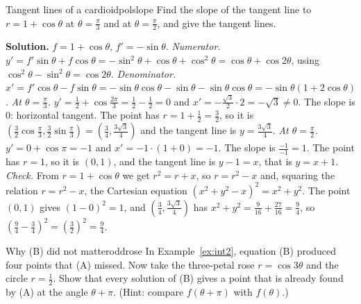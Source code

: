 \documentclass[11pt]{article}
\begin{document}
\begin{exmp}{Tangent lines of a cardioid}{polslope}
Find the slope of the tangent line to $r=1+\cos\theta$ at $\theta=\frac\pi3$ and at $\theta=\frac\pi2$, and give the tangent lines.

\textbf{Solution.} $f=1+\cos\theta$, $f'=-\sin\theta$. \emph{Numerator.} $y'=f'\sin\theta+f\cos\theta=-\sin^2\theta+\cos\theta+\cos^2\theta=\cos\theta+\cos2\theta$, using $\cos^2\theta-\sin^2\theta=\cos2\theta$. \emph{Denominator.} $x'=f'\cos\theta-f\sin\theta=-\sin\theta\cos\theta-\sin\theta-\sin\theta\cos\theta=-\sin\theta(1+2\cos\theta)$.
\emph{At $\theta=\frac\pi3$.} $y'=\frac12+\cos\frac{2\pi}3=\frac12-\frac12=0$ and $x'=-\frac{\sqrt3}2\cdot2=-\sqrt3\ne0$. The slope is $0$: horizontal tangent. The point has $r=1+\frac12=\frac32$, so it is $\left(\frac32\cos\frac\pi3,\frac32\sin\frac\pi3\right)=\left(\frac34,\frac{3\sqrt3}4\right)$ and the tangent line is $y=\frac{3\sqrt3}4$.
\emph{At $\theta=\frac\pi2$.} $y'=0+\cos\pi=-1$ and $x'=-1\cdot(1+0)=-1$. The slope is $\frac{-1}{-1}=1$. The point has $r=1$, so it is $(0,1)$, and the tangent line is $y-1=x$, that is $y=x+1$.
\emph{Check.} From $r=1+\cos\theta$ we get $r^2=r+x$, so $r=r^2-x$ and, squaring the relation $r=r^2-x$, the Cartesian equation $(x^2+y^2-x)^2=x^2+y^2$. The point $(0,1)$ gives $(1-0)^2=1$, and $\left(\frac34,\frac{3\sqrt3}4\right)$ has $x^2+y^2=\frac9{16}+\frac{27}{16}=\frac94$, so $\left(\frac94-\frac34\right)^2=\left(\frac32\right)^2=\frac94$.
\end{exmp}

\begin{think}{Why (B) did not matter}{oddrose}
In Example~\ref{ex:int2}, equation (B) produced four points that (A) missed. Now take the three-petal rose $r=\cos3\theta$ and the circle $r=\frac12$. Show that every solution of (B) gives a point that is already found by (A) at the angle $\theta+\pi$. (Hint: compare $f(\theta+\pi)$ with $f(\theta)$.)
\end{think}
\end{document}
